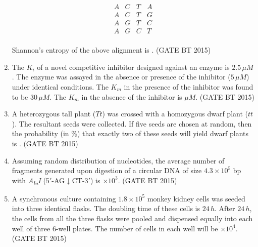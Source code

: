 \documentclass[journal,12pt,onecolumn]{IEEEtran}
\begin{document}
\begin{enumerate}[label=\textbf{Q.\arabic*}]
\[
\begin{array}{cccc}
A & C & T & A \\
A & C & T & G \\
A & G & T & C \\
A & G & C & T \\
\end{array}
\]

Shannon’s entropy of the above alignment is \underline{\hspace{2cm}}.
\hfill (GATE BT 2015)



\item The $K_i$ of a novel competitive inhibitor designed against an enzyme is  $2.5 \, \mu M$. The enzyme was assayed in the absence or presence of the inhibitor ($5 \, \mu M$) under identical conditions. The $K_m$ in the presence of the inhibitor was found to be $30 \, \mu M$. The $K_m$ in the absence of the inhibitor is \underline{\hspace{2cm}} $\mu M$. 
\hfill (GATE BT 2015)



\item A heterozygous tall plant ($Tt$) was crossed with a homozygous dwarf plant ($tt$). The resultant seeds were collected. If five seeds are chosen at random, then the probability (in \%) that exactly two of these seeds will yield dwarf plants is \underline{\hspace{2cm}}.
\hfill (GATE BT 2015)


 

\item Assuming random distribution of nucleotides, the average number of fragments generated upon digestion of a circular DNA of size $4.3 \times 10^{5}$ bp with \textit{A\textsubscript{lu}I} (5$'$-AG$\downarrow$CT-3$'$) is \underline{\hspace{2cm}} $\times 10^{3}$.
\hfill (GATE BT 2015)


\item A synchronous culture containing $1.8 \times 10^{5}$ monkey kidney cells was seeded into three identical flasks. The doubling time of these cells is $24 \, h$. After $24 \, h$, the cells from all the three flasks were pooled and dispensed equally into each well of three $6$-well plates. The number of cells in each well will be \underline{\hspace{2cm}} $\times 10^{4}$. 
\hfill (GATE BT 2015)





\end{enumerate}
\end{document}
